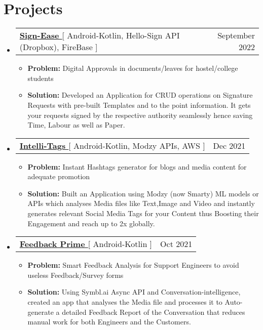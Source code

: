\documentclass[letterpaper,11pt]{article}
\makeatletter
\newcommand{\resumeItem}[1]{
  \item\small{
    {#1 \vspace{-2pt}}
  }
}
\newcommand{\resumeProjectHeading}[2]{
    \item
    \begin{tabular*}{0.97\textwidth}{l@{\extracolsep{\fill}}r}
      \small#1 & #2 \\
    \end{tabular*}\vspace{-7pt}
}
\newcommand{\resumeSubHeadingListStart}{\begin{itemize}[leftmargin=0.15in, label={}]}
\newcommand{\resumeSubHeadingListEnd}{\end{itemize}}
\newcommand{\resumeItemListStart}{\begin{itemize}}
\newcommand{\resumeItemListEnd}{\end{itemize}\vspace{-5pt}}
\makeatother
\begin{document}
\section{Projects}

 \resumeSubHeadingListStart
      \resumeProjectHeading
          {\textbf{\href{https://github.com/itsnitish22/Sign-Ease}{Sign-Ease }}{[ Android-Kotlin, Hello-Sign API (Dropbox), FireBase ]}}{September 2022}
          \resumeItemListStart
          \resumeItem{\textbf{Problem:} Digital Approvals in documents/leaves for hostel/college students}
          \resumeItem{\textbf{Solution:} Developed an Application for CRUD operations on Signature Requests with pre-built Templates and to the point information. It gets your requests signed by the respective authority seamlessly hence saving Time, Labour as well as Paper.}
          \resumeItemListEnd
    \resumeSubHeadingListEnd
    
 \resumeSubHeadingListStart
      \resumeProjectHeading
          {\textbf{\href{https://github.com/aniketk13/Intelli-Tags}{Intelli-Tags }}{[ Android-Kotlin, Modzy APIs, AWS ]}}{Dec 2021}
          \resumeItemListStart
          \resumeItem{\textbf{Problem:} Instant Hashtags generator for blogs and media content for adequate promotion}
          \resumeItem{\textbf{Solution:} Built an Application using Modzy (now Smarty) ML models or APIs which analyses Media files like Text,Image and Video and instantly generates relevant Social Media Tags for your Content thus Boosting their Engagement and reach up to 2x globally.}
          \resumeItemListEnd
    \resumeSubHeadingListEnd
    
    \resumeSubHeadingListStart
      \resumeProjectHeading
          {\textbf{\href{https://github.com/aniketk13/Feedback-Prime}{Feedback Prime }}{[ Android-Kotlin ]}}{Oct 2021}
          \resumeItemListStart
           \resumeItem{\textbf{Problem:} Smart Feedback Analysis for Support Engineers to avoid useless Feedback/Survey forms}
           \resumeItem{\textbf{Solution:} Using Symbl.ai Async API and Conversation-intelligence, created an app that analyses the Media file and processes it to Auto-generate a detailed Feedback Report of the Conversation that reduces manual work for both Engineers and the Customers.}
          \resumeItemListEnd
    \resumeSubHeadingListEnd
    
   
    




%
\end{document}
